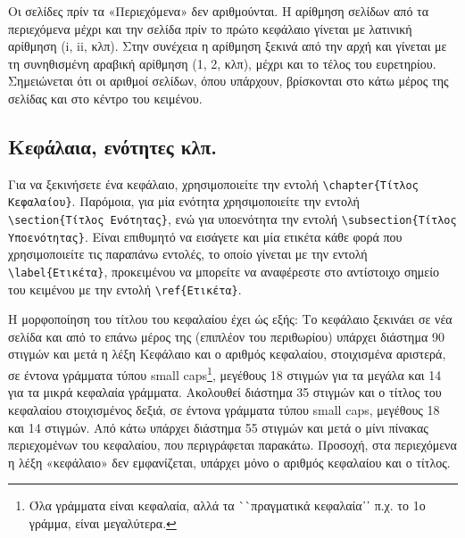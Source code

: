 Οι σελίδες πρίν τα «Περιεχόμενα» δεν αριθμούνται.
 Η αρίθμηση σελίδων από τα περιεχόμενα μέχρι και την σελίδα πρίν το πρώτο κεφάλαιο γίνεται με λατινική αρίθμηση (i, ii, κλπ).
 Στην συνέχεια η αρίθμηση ξεκινά από την αρχή και γίνεται με τη συνηθισμένη αραβική αρίθμηση (1, 2, κλπ), μέχρι και το τέλος του ευρετηρίου.
 Σημειώνεται ότι οι αριθμοί σελίδων, όπου υπάρχουν, βρίσκονται στο κάτω μέρος της σελίδας και στο κέντρο του κειμένου.


\subsection{Κεφάλαια, ενότητες κλπ.}
\label{subsec:Chapters}

Για να ξεκινήσετε ένα κεφάλαιο, χρησιμοποιείτε την εντολή 
\verb|\chapter{Τίτλος Κεφαλαίου}|. Παρόμοια, για μία ενότητα 
χρησιμοποιείτε την εντολή \verb|\section{Τίτλος Ενότητας}|, ενώ για υποενότητα 
την εντολή \verb|\subsection{Τίτλος Υποενότητας}|.
Είναι επιθυμητό να εισάγετε και μία ετικέτα κάθε φορά που χρησιμοποιείτε 
τις παραπάνω εντολές, το οποίο γίνεται με την εντολή \verb|\label{Ετικέτα}|, 
προκειμένου να μπορείτε να αναφέρεστε στο αντίστοιχο σημείο του κειμένου 
με την εντολή \verb|\ref{Ετικέτα}|.

Η μορφοποίηση του τίτλου του κεφαλαίου έχει ώς εξής:
Το κεφάλαιο ξεκινάει σε νέα σελίδα και από το επάνω μέρος της (επιπλέον του περιθωρίου) υπάρχει διάστημα 90 στιγμών και μετά η λέξη Κεφάλαιο και ο αριθμός κεφαλαίου, στοιχισμένα αριστερά, σε έντονα γράμματα τύπου small caps\footnote{Όλα γράμματα είναι κεφαλαία, αλλά τα ``πραγματικά κεφαλαία᾽᾽ π.χ. το 1ο γράμμα, είναι μεγαλύτερα.}, μεγέθους 18 στιγμών για τα μεγάλα και 14 για τα μικρά κεφαλαία γράμματα.
Ακολουθεί διάστημα 35 στιγμών και ο τίτλος του κεφαλαίου στοιχισμένος δεξιά, σε έντονα γράμματα τύπου small caps, μεγέθους 18 και 14 στιγμών.
Από κάτω υπάρχει διάστημα 55 στιγμών και μετά ο μίνι πίνακας περιεχομένων του κεφαλαίου, που περιγράφεται παρακάτω.
Προσοχή, στα περιεχόμενα η λέξη «κεφάλαιο» δεν εμφανίζεται, υπάρχει μόνο ο αριθμός κεφαλαίου και ο τίτλος.



